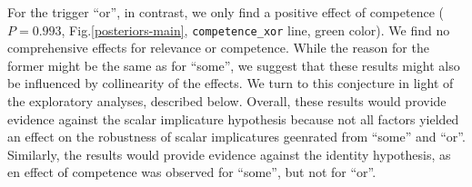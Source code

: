 \documentclass{sp}
\begin{document}
For the trigger ``or'', in contrast, we only find a positive effect of competence ($P =  0.993$, Fig.\ref{posteriors-main}, \texttt{competence\_xor} line, green color).  We find no comprehensive effects for relevance or competence. While the reason for the former might be the same as for ``some'', we suggest that these results might also be influenced by collinearity of the effects. We turn to this conjecture in light of the exploratory analyses, described below. 
Overall, these results would provide evidence against the scalar implicature hypothesis because not all factors yielded an effect on the robustness of scalar implicatures geenrated from ``some'' and ``or''. Similarly, the results would provide evidence against the identity hypothesis, as en effect of competence was observed for ``some'', but not for ``or''. 
\end{document}
